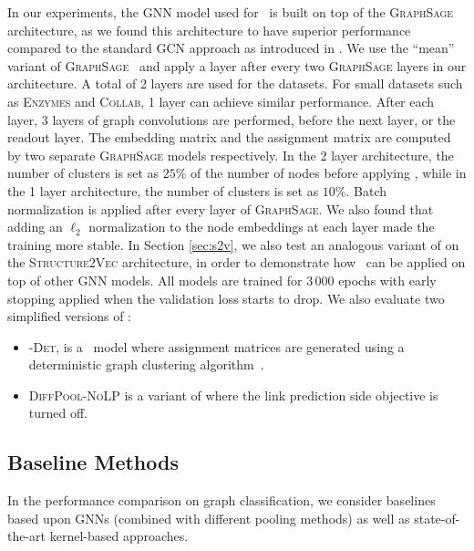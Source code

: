 In our experiments, the GNN model used for \name\ is built on top of the \textsc{GraphSage} architecture, as we found this architecture to have superior performance compared to the standard GCN approach as introduced in \cite{kipf2017semi}. 
We use the ``mean'' variant of \textsc{GraphSage}~\cite{hamilton2017inductive} and apply a \name layer after every two \textsc{GraphSage} layers in our architecture.
A total of 2 \name layers are used for the datasets. For small datasets such as \textsc{Enzymes} and \textsc{Collab}, 1 \name layer can achieve similar performance.
After each \name layer, 3 layers of graph convolutions are performed, before the next \name layer, or the readout layer.
The embedding matrix and the assignment matrix are computed by two separate \textsc{GraphSage} models respectively.
In the 2 \name layer architecture, the number of clusters is set as $25\%$ of the number of nodes before applying \name,
while in the 1 \name layer architecture, the number of clusters is set as $10\%$.
Batch normalization \cite{ioffe2015batch} is applied after every layer of \textsc{GraphSage}. 
We also found that adding an $\ell_2$ normalization to the node embeddings at each layer made the training more stable. 
In Section \ref{sec:s2v}, we also test an analogous variant of \name on the \textsc{Structure2Vec} \cite{dai2016discriminative} architecture, in order to demonstrate how \name\ can be applied on top of other GNN models. 
All models are trained for 3\,000 epochs with early stopping applied when the validation loss starts to drop.
We also evaluate two simplified versions of \name:
\begin{itemize}[leftmargin=15pt, topsep=-5pt, parsep=0pt]
 \item \textsc{\name-Det}, is a \name\ model where assignment matrices are generated using a deterministic graph clustering algorithm~\cite{dhillon2007weighted}.%
    \item
    \textsc{DiffPool-NoLP} is a variant of \textsc{\name} where the link prediction side objective is turned off.
\end{itemize}

\subsection{Baseline Methods}
In the performance comparison on graph classification, we consider baselines based upon GNNs (combined with different pooling methods) as well as state-of-the-art kernel-based approaches. 

